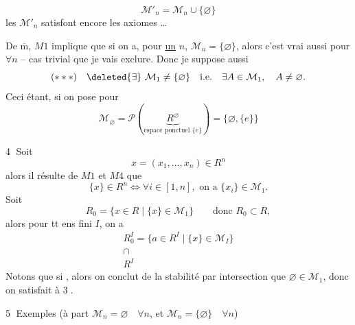 \[
\mathcal M'_n=\mathcal M_n\cup\{\varnothing\}
\]
les $\mathcal M'_n$ satisfont encore les axiomes \ldots


De $\overline{\mathrm m}$,  $M1$ implique que si on a, pour \uline{un} $n$,  $\mathcal M_n=\{\varnothing\}$, alors c'est vrai aussi pour $\forall n$ -- cas trivial  que je vais exclure. Donc je suppose aussi
\[
(***)\quad\deleted{\exists}\ \mathcal M_1\ne\{\varnothing\}\quad\text{i.e.}\quad\exists A\in\mathcal M_1,\quad A\ne\varnothing.
\]
Ceci étant, si on pose pour 
\[
\mathcal M_\varnothing=\mathcal P(\underbrace{R^\varnothing}_{\text{espace ponctuel }\{e\}})=\{\varnothing,\{e\}\}
\]

\textcircled{4} Soit 
\[
x=(x_1,\ldots,x_n)\in R^n
\]
alors il résulte de $M1$ et $M4$ que
\[
\{x\}\in R^n\Longleftrightarrow\forall i\in[1,n],\text{ on a }\{x_i\}\in\mathcal M_1.
\]
Soit
\[
R_0=\{x\in R\mid\{x\}\in\mathcal M_1\}\qquad\text{donc }R_0\subset R,
\]
alors pour tt ens fini $I$, on a
\[
\begin{array}{l}
R_0^I=\{a\in R^I\mid\{x\}\in\mathcal M_I\}\\
\cap\\
R^I
\end{array}
\]
Notons que si  , alors on conclut de la stabilité  par intersection que $\varnothing\in\mathcal M_1$, donc on satisfait à \textcircled{3}.

\textcircled{5} Exemples (à part $\mathcal M_n=\varnothing\quad\forall n$, et $\mathcal M_n=\{\varnothing\}\quad\forall n$)

